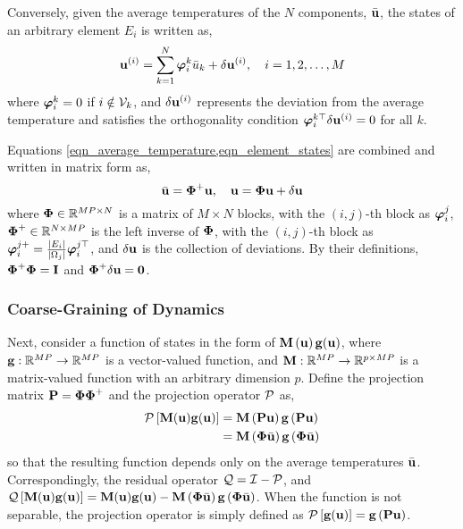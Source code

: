 Conversely, given the average temperatures of the $N$ components, $\bar{\mathbf{u}}$, the states of an arbitrary element $E_i$ is written as,
\begin{equation}
    \mathbf{u}^{(i)} = \sum_{k=1}^{N}\boldsymbol{\varphi}_i^{k}\bar{u}_k + \delta\mathbf{u}^{(i)}, \quad i=1,2,\dots,M\label{eqn_element_states}
\end{equation}
where $\boldsymbol{\varphi}_{i}^{k}=0$ if $i\notin\mathcal{V}_k$, and $\delta\mathbf{u}^{(i)}$ represents the deviation from the average temperature and satisfies the orthogonality condition $\boldsymbol{\varphi}_{i}^{k\top}\delta\mathbf{u}^{(i)}=0$ for all $k$.

Equations \cref{eqn_average_temperature,eqn_element_states} are combined and written in matrix form as,
\begin{equation}
    \bar{\mathbf{u}} = \boldsymbol{\Phi}^{+}\mathbf{u},\quad \mathbf{u} = \boldsymbol{\Phi}\mathbf{u} + \delta\mathbf{u}
\end{equation}
where $\boldsymbol{\Phi}\in\mathbb{R}^{MP\times N}$ is a matrix of $M\times N$ blocks, with the $(i,j)$-th block as $\boldsymbol{\varphi}_{i}^{j}$, $\boldsymbol{\Phi}^{+}\in\mathbb{R}^{N\times MP}$ is the left inverse of $\boldsymbol{\Phi}$, with the $(i,j)$-th block as $\boldsymbol{\varphi}_{i}^{j+} = \frac{|E_i|}{|\Omega_j|}\boldsymbol{\varphi}_{i}^{j\top}$, and $\delta\mathbf{u}$ is the collection of deviations. By their definitions, $\boldsymbol{\Phi}^{+}\boldsymbol{\Phi} = \mathbf{I}$ and $\boldsymbol{\Phi}^{+}\delta\mathbf{u} = \boldsymbol{0}$.

\subsubsection{Coarse-Graining of Dynamics}
Next, consider a function of states in the form of $\mathbf{M}\left(\mathbf{u}\right)\mathbf{g}(\mathbf{u})$, where $\mathbf{g}:\mathbb{R}^{MP} \to \mathbb{R}^{MP}$ is a vector-valued function, and $\mathbf{M}:\mathbb{R}^{MP} \to \mathbb{R}^{p\times MP}$ is a matrix-valued function with an arbitrary dimension $p$. Define the projection matrix $\mathbf{P}=\boldsymbol{\Phi}\boldsymbol{\Phi}^{+}$ and the projection operator $\mathcal{P}$ as,
\begin{align}
    \mathcal{P}\left[\mathbf{M}(\mathbf{u})\mathbf{g}(\mathbf{u})\right] &= \mathbf{M}\left(\mathbf{P}{\mathbf{u}}\right)\mathbf{g}\left(\mathbf{P}{\mathbf{u}}\right)\notag\\
    &= \mathbf{M}\left(\boldsymbol{\Phi}\bar{\mathbf{u}}\right)\mathbf{g}\left(\boldsymbol{\Phi}\bar{\mathbf{u}}\right)\label{eqn_projection_operator}
\end{align}
so that the resulting function depends only on the average temperatures $\bar{\mathbf{u}}$. Correspondingly, the residual operator $\mathcal{Q} = \mathcal{I} - \mathcal{P}$, and $\mathcal{Q}\left[\mathbf{M}(\mathbf{u})\mathbf{g}(\mathbf{u})\right] = \mathbf{M}(\mathbf{u})\mathbf{g}(\mathbf{u}) - \mathbf{M}\left(\boldsymbol{\Phi}\bar{\mathbf{u}}\right)\mathbf{g}\left(\boldsymbol{\Phi}\bar{\mathbf{u}}\right)$. When the function is not separable, the projection operator is simply defined as $\mathcal{P}\left[\mathbf{g}(\mathbf{u})\right] = \mathbf{g}\left(\mathbf{P}\mathbf{u}\right)$.

